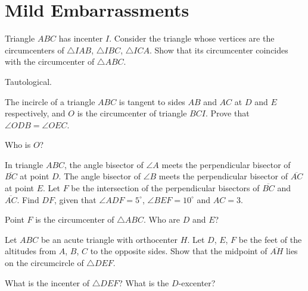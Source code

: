 \documentclass[11pt]{scrartcl}
\begin{document}
\section{Mild Embarrassments}
\begin{problem}
  [USAMO 1988] Triangle $ABC$ has incenter $I$.
  Consider the triangle whose vertices are the circumcenters of $\triangle IAB$, $\triangle IBC$, $\triangle ICA$.
  Show that its circumcenter coincides with the circumcenter of $\triangle ABC$.
  \begin{hint}
    Tautological.
  \end{hint}
\end{problem}
\begin{problem}
  [CGMO 2012] The incircle of a triangle $ABC$ is tangent to sides $AB$ and $AC$ at $D$ and $E$ respectively, and $O$ is the circumcenter of triangle $BCI$. Prove that $\angle ODB = \angle OEC$.
  \begin{hint}
    Who is $O$?
  \end{hint}
\end{problem}
\begin{problem}
   In triangle $ABC$, the angle bisector of $\angle A$
  meets the perpendicular bisector of $\overline{BC}$ at point $D$.
  The angle bisector of $\angle B$ meets the perpendicular bisector
  of $\overline{AC}$ at point $E$.
  Let $F$ be the intersection of the perpendicular bisectors of $\overline{BC}$ and $\overline{AC}$.
  Find $DF$, given that $\angle ADF = 5^{\circ}$,
  $\angle BEF = 10^{\circ}$ and $AC = 3$.
  \begin{hint}
    Point $F$ is the circumcenter of $\triangle ABC$.
    Who are $D$ and $E$?
  \end{hint}
\end{problem}
\begin{problem}
  Let $ABC$ be an acute triangle with orthocenter $H$.
  Let $D$, $E$, $F$ be the feet of the altitudes from $A$, $B$, $C$ to the opposite sides.
  Show that the midpoint of $\overline{AH}$ lies on the circumcircle of $\triangle DEF$.
  \begin{hint}
    What is the incenter of $\triangle DEF$?
    What is the $D$-excenter?
  \end{hint}
\end{problem}
\end{document}
